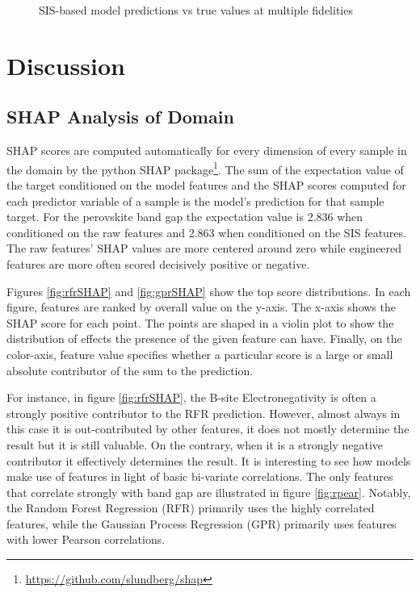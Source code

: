  
\begin{figure}[htbp]
\centering

\caption{\label{fig:sis-pairplots} SIS-based model predictions vs true values at multiple fidelities}
\end{figure}

\section{Discussion}
\label{sec:org0359b0f}
\subsection{SHAP Analysis of Domain}
\label{sec:orgfa003dc}
SHAP scores are computed automatically for every dimension of every sample in the domain by the python SHAP package\footnote{\url{https://github.com/slundberg/shap}}.
The sum of the expectation value of the target conditioned on the model features and the  SHAP scores computed for each predictor variable of a sample is the model's  prediction for that sample target.
\autocite{lundberg-2017-unified-approac}
For the perovskite band gap the expectation value is 2.836 when conditioned on the raw features and 2.863 when conditioned on the SIS features.
The raw features' SHAP values are more centered around zero while engineered features are more often scored decisively positive or negative.

Figures \ref{fig:rfrSHAP} and \ref{fig:gprSHAP} show the top score distributions.
In each figure, features are ranked by overall value on the y-axis.
The x-axis shows the SHAP score for each point.
The points are shaped in a violin plot to show the distribution of effects the presence of the given feature can have.
Finally, on the color-axis, feature value specifies whether a particular score is a large or small absolute contributor of the sum to the prediction.

For instance, in figure \ref{fig:rfrSHAP}, the B-site Electronegativity is often a strongly positive contributor to the RFR prediction.
However, almost always in this case it is out-contributed by other features, it does not mostly determine the result but it is still valuable.
On the contrary, when it is a strongly negative contributor it effectively determines the result.
It is interesting to see how models make use of features in light of basic bi-variate correlations.
The only features that correlate strongly with band gap are illustrated in figure \ref{fig:rpear}.
Notably, the Random Forest Regression (RFR) primarily uses the highly correlated features, while the Gaussian Process Regression (GPR) primarily uses features with lower Pearson correlations.

